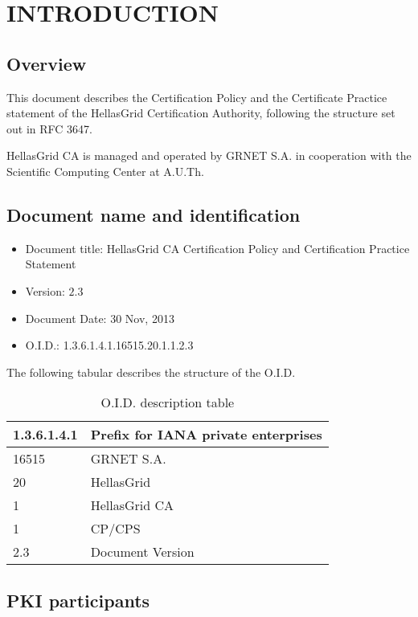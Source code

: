 
\chapter{INTRODUCTION}
\section{Overview}

This document describes the Certification Policy and the Certificate Practice statement of the HellasGrid Certification Authority, following the structure set out in RFC 3647. 

HellasGrid CA is managed and operated by GRNET S.A. in cooperation with the Scientific Computing Center at A.U.Th.

\section{Document name and identification}
\label{sec:DocumentNameAndIdentification}

\begin{itemize}
\item{Document title: HellasGrid CA Certification Policy and Certification Practice Statement}
\item{Version: $2.3$}
\item{Document Date: 30 Nov, 2013}
\item{O.I.D.: 1.3.6.1.4.1.16515.20.1.1.2.3}
\end{itemize}
The following tabular describes the structure of the O.I.D.

\begin{table}[hbt]
\begin{center}
\begin{tabular}{|l|l|}
\hline
1.3.6.1.4.1 & Prefix for IANA private enterprises \\
\hline
16515 & GRNET S.A. \\
\hline
20 & HellasGrid \\
\hline
1 & HellasGrid CA \\
\hline
1 & CP/CPS \\
\hline
2.3 & Document Version \\
\hline
\end{tabular}
\end{center}
\caption{O.I.D. description table}
\end{table}

\section{PKI participants}

